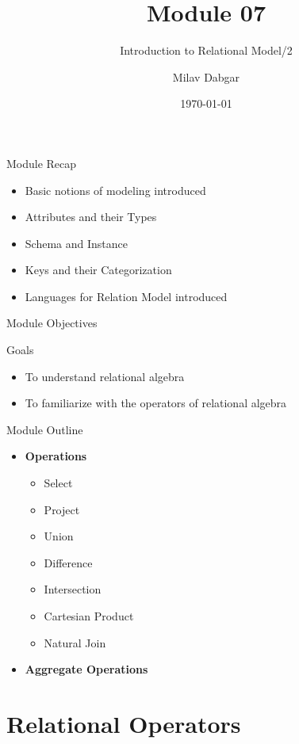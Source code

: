 \documentclass[aspectratio=169, xcolor=dvipsnames]{beamer}
\title{Module 07}
\subtitle{Introduction to Relational Model/2}
\author{Milav Dabgar}
\institute{www.milav.in}
\date{\today}
\begin{document}
\begin{frame}
    \titlepage
\end{frame}

\begin{frame}{Module Recap}
    \begin{itemize}[<+->]
        \item Basic notions of modeling introduced
        \item Attributes and their Types
        \item Schema and Instance
        \item Keys and their Categorization
        \item Languages for Relation Model introduced
    \end{itemize}
\end{frame}

\begin{frame}{Module Objectives}
    \begin{block}{Goals}
        \begin{itemize}[<+->]
            \item To understand relational algebra
            \item To familiarize with the operators of relational algebra
        \end{itemize}
    \end{block}
\end{frame}

\begin{frame}{Module Outline}
    \begin{itemize}[<+->]
        \item \textbf{Operations}
        \begin{itemize}
            \item Select
            \item Project
            \item Union
            \item Difference
            \item Intersection
            \item Cartesian Product
            \item Natural Join
        \end{itemize}
        \item \textbf{Aggregate Operations}
    \end{itemize}
\end{frame}

\section{Relational Operators}
\end{document}
